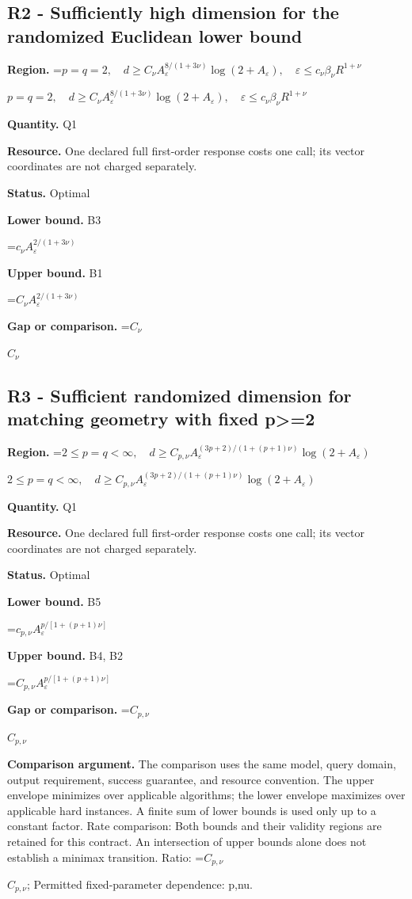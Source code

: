 \documentclass[10pt,a4paper]{article}
\newcommand{\AtlasMath}[1]{\par\begingroup\centering\setbox0=\hbox{$\displaystyle #1$}\ifdim\wd0>1.4\linewidth\typeout{ATLAS WIDE FORMULA: \the\wd0}\fi\ifdim\wd0>\linewidth\resizebox{\linewidth}{!}{\box0}\else\box0\fi\par\endgroup}
\newcommand{\AtlasInlineMath}[1]{\begingroup\setbox0=\hbox{$#1$}\ifdim\wd0>.4\linewidth\endgroup\AtlasMath{#1}\else\endgroup$#1$\fi}
\begin{document}
\subsection{R2 - Sufficiently high dimension for the randomized Euclidean lower bound}
\textbf{Region.} \AtlasInlineMath{p=q=2,\quad d\ge C_\nu A_\varepsilon^{8/(1+3\nu)}\log(2+A_\varepsilon),\quad\varepsilon\le c_\nu\beta_\nu R^{1+\nu}}

\textbf{Quantity.} Q1

\textbf{Resource.} One declared full first-order response costs one call; its vector coordinates are not charged separately.

\textbf{Status.} Optimal

\textbf{Lower bound.} B3

\AtlasMath{c_\nu A_\varepsilon^{2/(1+3\nu)}}
\textbf{Upper bound.} B1

\AtlasMath{C_\nu A_\varepsilon^{2/(1+3\nu)}}
\textbf{Gap or comparison.} \AtlasInlineMath{C_\nu}

\subsection{R3 - Sufficient randomized dimension for matching geometry with fixed p>=2}
\textbf{Region.} \AtlasInlineMath{2\le p=q<\infty,\quad d\ge C_{p,\nu}A_\varepsilon^{(3p+2)/(1+(p+1)\nu)}\log(2+A_\varepsilon)}

\textbf{Quantity.} Q1

\textbf{Resource.} One declared full first-order response costs one call; its vector coordinates are not charged separately.

\textbf{Status.} Optimal

\textbf{Lower bound.} B5

\AtlasMath{c_{p,\nu}A_\varepsilon^{p/[1+(p+1)\nu]}}
\textbf{Upper bound.} B4, B2

\AtlasMath{C_{p,\nu}A_\varepsilon^{p/[1+(p+1)\nu]}}
\textbf{Gap or comparison.} \AtlasInlineMath{C_{p,\nu}}

\textbf{Comparison argument.} The comparison uses the same model, query domain, output requirement, success guarantee, and resource convention. The upper envelope minimizes over applicable algorithms; the lower envelope maximizes over applicable hard instances. A finite sum of lower bounds is used only up to a constant factor. Rate comparison: Both bounds and their validity regions are retained for this contract. An intersection of upper bounds alone does not establish a minimax transition. Ratio: \AtlasInlineMath{C_{p,\nu}}; Permitted fixed-parameter dependence: p,nu.
\end{document}
